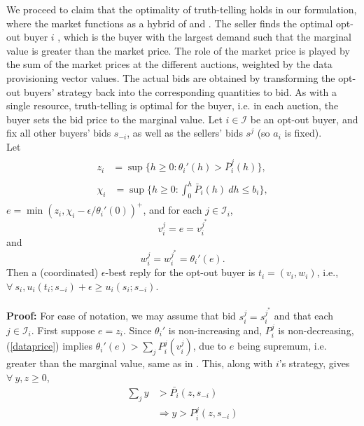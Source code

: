 \documentclass[12pt]{article}
\theoremstyle{definition}
\newcommand{\mcI}{\mathcal{I}}
\begin{document}
\begin{multicols}{2}
We proceed to claim that the optimality of truth-telling holds in our
formulation, where the market functions as a hybrid of \cite{semret} and
\cite{zheng}. The seller
finds the optimal opt-out buyer $i$ , which is the buyer with the largest demand such that the marginal value is greater than the market price.
The role of the market price is played by the sum of the market prices at the
different auctions, weighted by the data provisioning vector values. The actual bids are
obtained by transforming the opt-out buyers' strategy back into the
corresponding quantities to bid. As with a single resource,
truth-telling is optimal for the buyer, i.e. in each auction, the buyer sets
the bid price to the marginal value.
{
\label{buyerincentivecompatibility}
Let $i\in\mcI$ be an opt-out buyer, and fix all other buyers' bids
$s_{-i}$, as well as the sellers' bids $s^j$ (so $a_i$ is fixed). \\
Let 
\begin{align}
\begin{split}
    z_i &= \sup\bigg\lbrace h\ge 0 : 
 {\theta_i}'(h) > \bar{P}_i^j(h)\bigg\rbrace, 
\end{split}\\
\begin{split}
    \chi_i &= \sup\bigg\lbrace h\ge 0: 
\displaystyle\int_0^h 
    \bar{P}_i(h) \ dh \le b_i\bigg\rbrace,
\end{split}
\end{align}
$e = \min(z_i, \chi_i - \epsilon / \theta_i'(0))^+$, and for each $j \in
\mcI_i$, 
$$
    v_i^j = e = v_i^{j^*}
$$
and 
$$
    w_i^j = w_i^{j^*} = \theta_i'(e).
$$
Then a (coordinated) $\epsilon$-best reply for the opt-out buyer is $t_i =
(v_i,w_i)$, i.e., $\forall \ s_i, u_i(t_i;s_{-i}) + \epsilon \ge u_i(s_i;
s_{-i})$.
} \\ \\
\textbf{Proof:} For ease of notation, we may assume that bid
$s_i^j=s_i^{j^*}$ and that each $j\in\mcI_i$.
First suppose $e = z_i$. Since $\theta_i'$ is non-increasing
and, $P_i^j$ is non-decreasing, (\ref{dataprice}) implies
$\theta_i'(e) >\sum_j P_i^j(v_i^j)$, due to $e$ being supremum, i.e.
greater than the marginal value, same as in \cite{semret}. This,
along with $i$'s strategy, gives $\forall \ y,z \ge 0$,
\begin{align*}
    \displaystyle\sum_{j} y &> \bar{P_i}(z,s_{-i}) \\
    &\Rightarrow y > P_i^j(z,s_{-i})\\

\end{align*}
\end{multicols}
\end{document}
